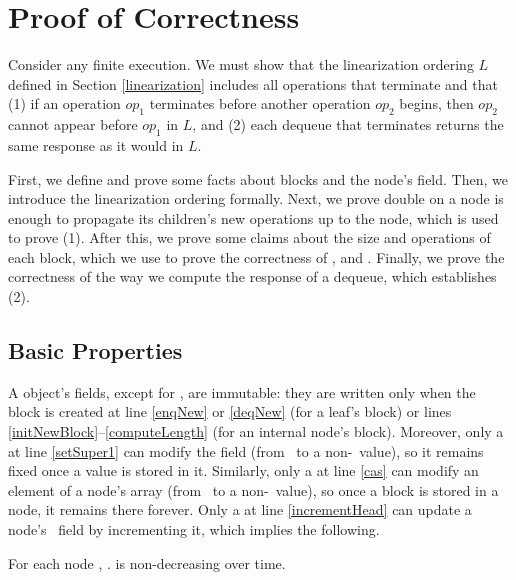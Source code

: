 
\section{Proof of Correctness}

Consider any finite execution.  We must show that the linearization ordering $L$ defined in Section \ref{linearization} includes all operations that terminate and that 
(1) if an operation $op_1$ terminates before another operation $op_2$ begins, then $op_2$ cannot appear
before $op_1$ in $L$, and (2) each dequeue that terminates returns the same response as it would 
in $L$.

First, we define and prove some facts about blocks and the node's  field. Then, we introduce  the linearization ordering formally. Next, we prove double  on a node is enough to propagate its children's new operations up to the node, which is used to prove (1). After this, we prove some claims about the size and operations of each block, which we use to prove the correctness of ,  and . Finally, we prove the correctness of the way we compute the response of a dequeue, which establishes (2).

\subsection{Basic Properties}

A  object's fields, except for , are immutable:  they are written only 
when the block is created at line \ref{enqNew} or \ref{deqNew} (for a leaf's block) or lines \ref{initNewBlock}--\ref{computeLength} (for an internal node's block).  
Moreover, only a  at line \ref{setSuper1} can modify the  field 
(from \nl\ to a non-\nl\ value), so it remains fixed once a value is stored in it.
Similarly, only a  at line \ref{cas} can modify an element of a node's  array 
(from \nl\ to a non-\nl\ value), so once a block is stored in a node, it remains there forever.
Only a  at line \ref{incrementHead} can update a node's \head\ field by incrementing it,
which implies the following.

\begin{observation} \label{nonDecreasingHead}
For each node ,  . is non-decreasing over time.
\end{observation}

